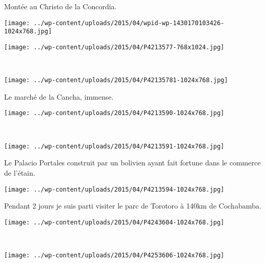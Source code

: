 \pagebreak
 Montée au Christo de la Concordia. 
\begin{center} \texttt{[image: ../wp-content/uploads/2015/04/wpid-wp-1430170103426-1024x768.jpg]} \end{center}
\begin{center} \texttt{[image: ../wp-content/uploads/2015/04/P4213577-768x1024.jpg]} \end{center}
\vspace{-\topsep}
\vspace{-0.75mm}

\pagebreak
~
\vspace{-9.5mm}
\begin{center} \texttt{[image: ../wp-content/uploads/2015/04/P42135781-1024x768.jpg]} \end{center}

 Le marché de la Cancha, immense. 
\begin{center} \texttt{[image: ../wp-content/uploads/2015/04/P4213590-1024x768.jpg]} \end{center}
\vspace{-\topsep}

\pagebreak
~\\
\begin{center} \texttt{[image: ../wp-content/uploads/2015/04/P4213591-1024x768.jpg]} \end{center}

 Le Palacio Portales construit par un bolivien ayant fait fortune dans le commerce de l'étain. 
\begin{center} \texttt{[image: ../wp-content/uploads/2015/04/P4213594-1024x768.jpg]} \end{center}
\vspace{-\topsep}

\pagebreak
 Pendant 2 jours je suis parti visiter le parc de Torotoro à 140km de Cochabamba. 
\begin{center} \texttt{[image: ../wp-content/uploads/2015/04/P4243604-1024x768.jpg]} \end{center}
~\\
\begin{center} \texttt{[image: ../wp-content/uploads/2015/04/P4253606-1024x768.jpg]} \end{center}
\vspace{-\topsep}

